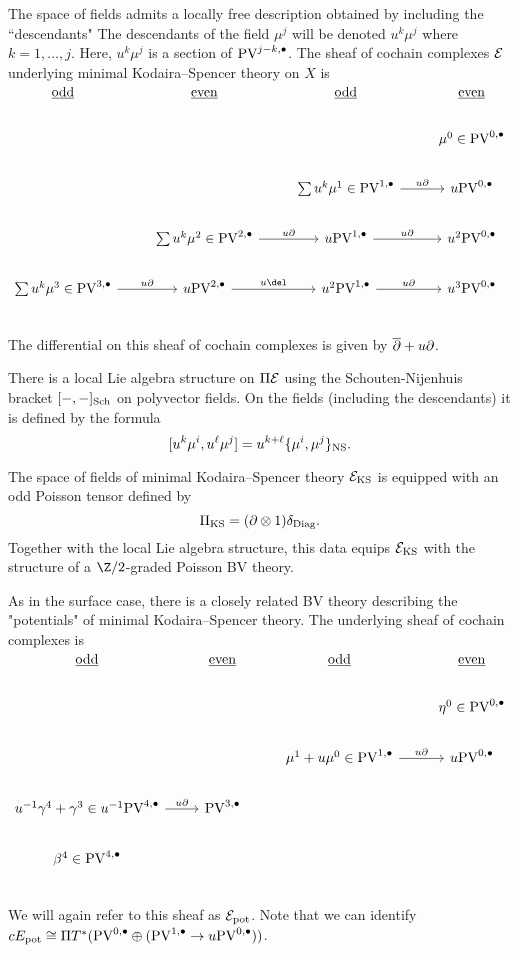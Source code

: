 \documentclass[11pt]{amsart}
\def\PV{{\rm PV}}
\begin{document}
The space of fields admits a locally free description obtained by including the ``descendants" 
The descendants of the field $\mu^j$ will be denoted $u^k \mu^j$ where $k = 1,\ldots, j$.
Here, $u^k \mu^j$ is a section of $\PV^{j - k, \bu}$.
The sheaf of cochain complexes $\mathcal E$ underlying minimal Kodaira--Spencer theory on $X$ is
\[
\begin{tikzcd}
\ul{\rm odd} & \ul{\rm even} & \ul{\rm odd} & \ul{\rm even} \\
& & & \mu^0 \in \PV^{0,\bu} \\
& & \sum u^k \mu^1 \in \PV^{1,\bu} \ar[r, "u \partial"] & u \PV^{0,\bu} \\
& \sum u^k \mu^2 \in  \PV^{2,\bu} \ar[r,"u \partial"] & u \PV^{1,\bu} \ar[r, "u \partial"] & u^2 \PV^{0,\bu} \\
\sum u^k \mu^3 \in \PV^{3,\bu} \ar[r, "u \partial"]& u \PV^{2,\bu} \ar[r,"u \del"] & u^2 \PV^{1,\bu} \ar[r, "u \partial"] & u^3\PV^{0,\bu} \\
\end{tikzcd}
\]
The differential on this sheaf of cochain complexes is given by $\overline{\partial} + u \partial$.

There is a local Lie algebra structure on $\Pi\mathcal E$ using the Schouten-Nijenhuis bracket $[-,-]_{\rm Sch}$ on polyvector fields.
On the fields (including the descendants) it is defined by the formula
\[
[u^k \mu^i , u^\ell \mu^j] = u^{k+\ell} \{\mu^i, \mu^j\}_{\rm NS} .
\]

The space of fields of minimal Kodaira--Spencer theory $\mathcal E_{\rm KS}$ is equipped with an odd Poisson tensor defined by
\[
\Pi_{\rm KS} = (\partial \otimes 1) \delta_{\rm Diag} .
\]
Together with the local Lie algebra structure, this data equips $\mathcal E_{\rm KS}$ with the structure of a $\Z/2$-graded Poisson BV theory.

As in the surface case, there is a closely related BV theory describing the "potentials" of minimal Kodaira--Spencer theory.
The underlying sheaf of cochain complexes is
\[
\begin{tikzcd}
\ul{\rm odd} & \ul{\rm even} & \ul{\rm odd} & \ul{\rm even} \\
& & & \eta^{0}\in\PV^{0,\bu} \\
& & \mu^{1}+u\mu^{0}\in\PV^{1,\bu} \ar[r, "u \partial"] & u \PV^{0,\bu} \\
u^{-1} \gamma^4 + \gamma^3  \in u^{-1} \PV^{4,\bu} \ar[r, "u \partial"] & \PV^{3,\bu} & &  \\
\beta^{4} \in\PV^{4,\bu} &  &  & \\
\end{tikzcd}
\]
We will again refer to this sheaf as $\mathcal E_{\rm pot}$. Note that we can identify $cE_{\rm pot}\cong \Pi T^{*}(\PV^{0,\bu}\oplus (\PV^{1,\bu}\to u\PV^{0,\bu}))$.
\end{document}
